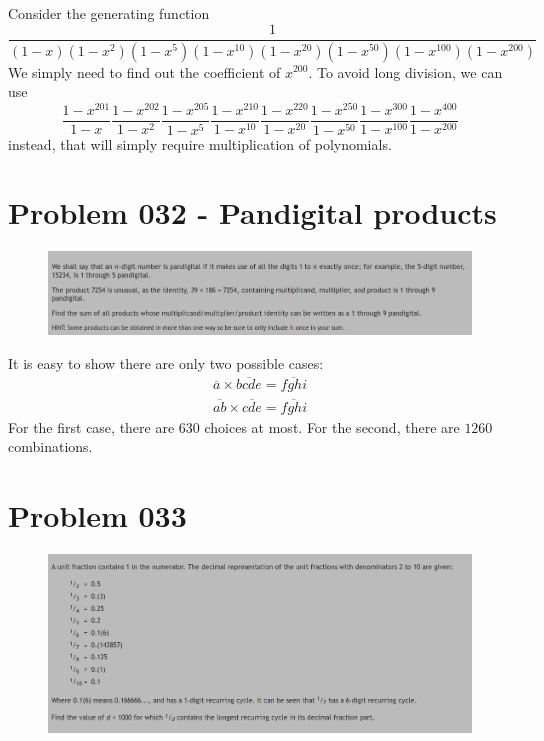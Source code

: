\begin{sol}
Consider the generating function 
$$\dfrac{1}{ (1 - x)(1 - x^2)(1 - x^5)(1 - x^{10})(1 - x^{20})(1 - x^{50})(1 - x^{100})(1 - x^{200})}$$
We simply need to find out the coefficient of $x^{200}$. To avoid long division, we can use 
$$\dfrac{1 - x ^ {201}}{1 - x} \dfrac{1 - x ^ {202}}{1 - x^2} \dfrac{1 - x^{205}}{1 - x^5} \dfrac{1 - x ^ {210}}{1 - x ^{10}}\dfrac{1 - x^{220}}{1 - x^{20}}\dfrac{1 - x^{250}}{1 - x^{50}} \dfrac{1 - x^{300}}{1 - x^{100}}\dfrac{1 - x^{400}}{1 - x^{200}}$$
instead, that will simply require multiplication of polynomials.
\vspace{1cm}
\end{sol}
\section{Problem 032 - Pandigital products}
\begin{prob}
	\begin{figure}[htb!]
		\begin{center}
			\includegraphics[scale = 0.4]{pic/032.png}
		\end{center}
	\end{figure}
\end{prob}
\begin{sol}
It is easy to show there are only two possible cases:
\begin{eqnarray}
\overline{a} \times \overline{bcde} = \overline{fghi}\\
\overline{ab}\times \overline{cde} = \overline{fghi}
\end{eqnarray}
For the first case, there are $630$ choices at most. For the second, there are $1260$ combinations.
\end{sol}

\section{Problem 033}
\begin{prob}
	\begin{figure}[htb!]
		\begin{center}
			\includegraphics[scale = 0.4]{pic/026.png}
		\end{center}
	\end{figure}
\end{prob}
